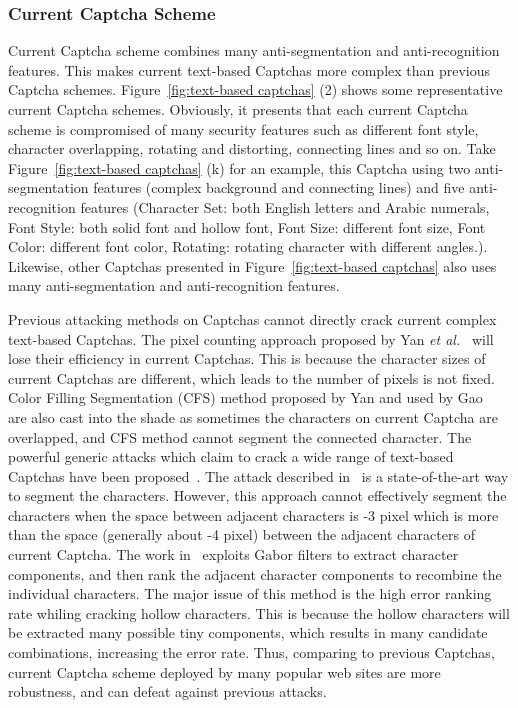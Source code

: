 \subsubsection{Current Captcha Scheme}
Current Captcha scheme combines many anti-segmentation and anti-recognition features. This makes current text-based Captchas more complex than previous Captcha schemes. Figure~\ref{fig:text-based captchas} (2) shows some representative current Captcha schemes. Obviously, it presents that each current Captcha scheme is compromised of many security features such as different font style, character overlapping, rotating and distorting, connecting lines and so on. Take Figure~\ref{fig:text-based captchas} (k) for an example, this Captcha using two anti-segmentation features (complex background and connecting lines) and five anti-recognition features (Character Set: both English letters and Arabic numerals, Font Style: both solid font and hollow font, Font Size: different font size, Font Color: different font color, Rotating: rotating character with different angles.). Likewise, other Captchas presented in Figure~\ref{fig:text-based captchas} also uses many anti-segmentation and anti-recognition features.

Previous attacking methods on Captchas cannot directly crack current complex text-based Captchas.
The pixel counting approach proposed by Yan \emph{et al.}~\cite{Yan2007Breaking} will lose their efficiency in current Captchas. This is because the character sizes of current Captchas are different, which leads to the number of pixels is not fixed.
Color Filling Segmentation (CFS) method proposed by Yan and used by Gao~\cite{Yan2008A,Gao2013The} are also cast into the shade as sometimes the characters on current Captcha are overlapped, and CFS method cannot segment the connected character.
The powerful generic attacks which claim to crack a wide range of text-based Captchas have been proposed~\cite{Bursztein2014The,Gao2016A}. The attack described in~\cite{Bursztein2014The} is a state-of-the-art way to segment the characters. However, this approach cannot effectively segment the characters when the space between adjacent characters is -3 pixel which is more than the space (generally about -4 pixel) between the adjacent characters of current Captcha.
The work in~\cite{Gao2016A} exploits Gabor filters to extract character components, and then rank the adjacent character components to recombine the individual characters. The major issue of this method is the high error ranking rate whiling cracking hollow characters. This is because the hollow characters will be extracted many possible tiny components, which results in many candidate combinations, increasing the error rate.
Thus, comparing to previous Captchas, current Captcha scheme deployed by many popular web sites are more robustness, and can defeat against previous attacks.

